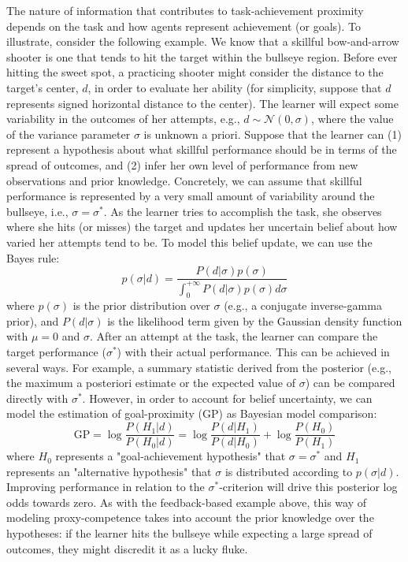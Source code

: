 The nature of information that contributes to task-achievement proximity depends on the task and how agents represent achievement (or goals). To illustrate, consider the following example. We know that a skillful bow-and-arrow shooter is one that tends to hit the target within the bullseye region. Before ever hitting the sweet spot, a practicing shooter might consider the distance to the target's center, $d$, in order to evaluate her ability (for simplicity, suppose that $d$ represents signed horizontal distance to the center). The learner will expect some variability in the outcomes of her attempts, e.g., $d \sim \mathcal{N}(0, \sigma)$, where the value of the variance parameter $\sigma$ is unknown a priori. Suppose that the learner can (1) represent a hypothesis about what skillful performance should be in terms of the spread of outcomes, and (2) infer her own level of performance from new observations and prior knowledge. Concretely, we can assume that skillful performance is represented by a very small amount of variability around the bullseye, i.e., $\sigma=\sigma^*$. As the learner tries to accomplish the task, she observes where she hits (or misses) the target and updates her uncertain belief about how varied her attempts tend to be. To model this belief update, we can use the Bayes rule:
\begin{equation}
    p(\sigma|d) = \frac{P(d|\sigma)p(\sigma)}{\int_{0}^{+\infty}P(d|\sigma)p(\sigma)d \sigma}
\end{equation}
where $p(\sigma)$ is the prior distribution over $\sigma$ (e.g., a conjugate inverse-gamma prior), and $P(d|\sigma)$ is the likelihood term given by the Gaussian density function with $\mu=0$ and $\sigma$. After an attempt at the task, the learner can compare the target performance ($\sigma^*$) with their actual performance. This can be achieved in several ways. For example, a summary statistic derived from the posterior (e.g., the maximum a posteriori estimate or the expected value of $\sigma$) can be compared directly with $\sigma^*$. However, in order to account for belief uncertainty, we can model the estimation of goal-proximity ($\mathrm{GP}$) as Bayesian model comparison:
\begin{equation}
   \mathrm{GP} = \log \frac{P(H_1|d)}{P(H_0|d)} = \log \frac{P(d|H_1)}{P(d|H_0)} + \log \frac{P(H_0)}{P(H_1)}
\end{equation}
where $H_0$ represents a "goal-achievement hypothesis" that $\sigma = \sigma^*$ and $H_1$ represents an "alternative hypothesis" that $\sigma$ is distributed according to $p(\sigma|d)$. Improving performance in relation to the $\sigma^*$-criterion will drive this posterior log odds towards zero. As with the feedback-based example above, this way of modeling proxy-competence takes into account the prior knowledge over the hypotheses: if the learner hits the bullseye while expecting a large spread of outcomes, they might discredit it as a lucky fluke. 

